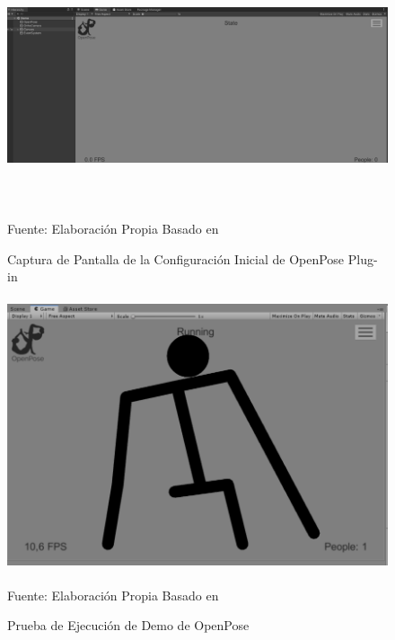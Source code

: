 \begin{figure}[t!]
	\centering
	\includegraphics[width=15cm,height=7cm,]{./Images/unitydemo.png}
	\caption{Captura de Pantalla de la Configuración Inicial de OpenPose Plug-in}
	\footnotesize Fuente: Elaboración Propia Basado en \cite{8765346}
	\label{unitydemo}
\end{figure}
\clearpage
\null

\begin{figure}[t!]
	\centering
	\includegraphics[width=14cm,height=8cm,]{./Images/ejemploopenunity.png}
	\caption{Prueba de Ejecución de Demo de OpenPose}
	\footnotesize Fuente: Elaboración Propia Basado en \cite{8765346}
	\label{unitydemoexample}
\end{figure}


